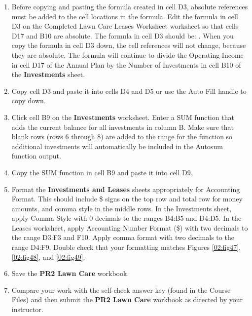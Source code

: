 \begin{enumerate}
	\item Before copying and pasting the formula created in cell \textsf{D3}, absolute references must be added to the cell locations in the formula. Edit the formula in cell \textsf{D3} on the Completed Lawn Care Leases Worksheet worksheet so that cells \textsf{D17} and \textsf{B10} are absolute. The formula in cell D3 should be: . When you copy the formula in cell \textsf{D3} down, the cell references will not change, because they are absolute. The formula will continue to divide the Operating Income in cell \textsf{D17} of the Annual Plan by the Number of Investments in cell \textsf{B10} of the \textbf{Investments} sheet.
	
	\item Copy cell \textsf{D3} and paste it into cells \textsf{D4} and \textsf{D5} or use the Auto Fill handle to copy down.
	
	\item Click cell \textsf{B9} on the \textbf{Investments} worksheet. Enter a SUM function that adds the current balance for all investments in column B. Make sure that blank rows (rows 6 through 8) are added to the range for the function so additional investments will automatically be included in the Autosum function output.
	
	\item Copy the SUM function in cell \textsf{B9} and paste it into cell \textsf{D9}.
	
	\item Format the \textbf{Investments and Leases} sheets appropriately for Accounting Format. This should include \$ signs on the top row and total row for money amounts, and comma style in the middle rows. In the Investments sheet, apply Comma Style with $ 0 $ decimals to the ranges \textsf{B4:B5} and \textsf{D4:D5}. In the Leases worksheet, apply Accounting Number Format (\$) with two decimals to the range \textsf{D3:F3} and \textsf{F10}. Apply comma format with two decimals to the range \textsf{D4:F9}. Double check that your formatting matches Figures \ref{02:fig47}, \ref{02:fig48}, and \ref{02:fig49}.
	
	\item Save the \textbf{PR2 Lawn Care} workbook.
	
	\item Compare your work with the self-check answer key (found in the Course Files) and then submit the \textbf{PR2 Lawn Care} workbook as directed by your instructor.
\end{enumerate}

